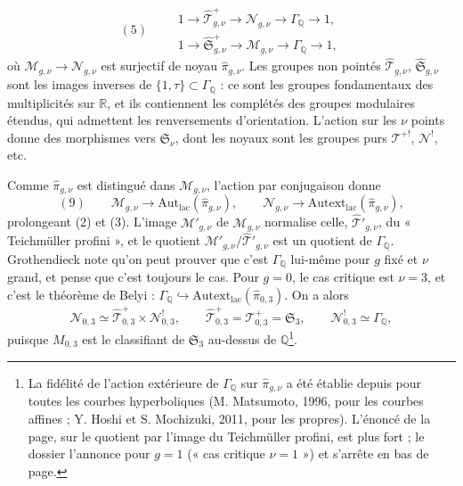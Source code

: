 \documentclass[11pt,a4paper]{article}
\begin{document}
\[
(5)\qquad
\begin{gathered}
1 \to \hat{\mathcal{T}}^{+}_{g,\nu} \to \mathcal{N}_{g,\nu} \to \Gamma_{\mathbb{Q}} \to 1, \\
1 \to \hat{\mathfrak{S}}^{+}_{g,\nu} \to \mathcal{M}_{g,\nu} \to \Gamma_{\mathbb{Q}} \to 1,
\end{gathered}
\]
où $\mathcal{M}_{g,\nu} \to \mathcal{N}_{g,\nu}$ est surjectif de noyau
$\hat\pi_{g,\nu}$. Les groupes non pointés $\hat{\mathcal{T}}_{g,\nu}$,
$\hat{\mathfrak{S}}_{g,\nu}$ sont les images inverses de
$\{1, \tau\} \subset \Gamma_{\mathbb{Q}}$ : ce sont les groupes fondamentaux
des multiplicités sur $\mathbb{R}$, et ils contiennent les complétés des groupes
modulaires étendus, qui admettent les renversements d'orientation. L'action
sur les $\nu$ points donne des morphismes vers $\mathfrak{S}_\nu$, dont les
noyaux sont les groupes purs $\mathcal{T}^{+!}$, $\mathcal{N}^{!}$, etc.

Comme $\hat\pi_{g,\nu}$ est distingué dans $\mathcal{M}_{g,\nu}$, l'action par
conjugaison donne
\[
(9)\qquad \mathcal{M}_{g,\nu} \to \mathrm{Aut}_{\mathrm{lac}}(\hat\pi_{g,\nu}), \qquad
\mathcal{N}_{g,\nu} \to \mathrm{Autext}_{\mathrm{lac}}(\hat\pi_{g,\nu}),
\]
prolongeant (2) et (3). L'image $\mathcal{M}'_{g,\nu}$ de $\mathcal{M}_{g,\nu}$
normalise celle, $\hat{\mathcal{T}}'_{g,\nu}$, du « Teichmüller profini », et
le quotient $\mathcal{M}'_{g,\nu}/\hat{\mathcal{T}}'_{g,\nu}$ est un quotient de
$\Gamma_{\mathbb{Q}}$. Grothendieck note qu'on peut prouver que c'est
$\Gamma_{\mathbb{Q}}$ lui-même pour $g$ fixé et $\nu$ grand, et pense que c'est
toujours le cas. Pour $g = 0$, le cas critique est $\nu = 3$, et c'est le
théorème de Belyi : $\Gamma_{\mathbb{Q}} \hookrightarrow
\mathrm{Autext}_{\mathrm{lac}}(\hat\pi_{0,3})$. On a alors
\[
\mathcal{N}_{0,3} \simeq \hat{\mathcal{T}}^{+}_{0,3} \times \mathcal{N}^{!}_{0,3},
\qquad \hat{\mathcal{T}}^{+}_{0,3} = \mathcal{T}^{+}_{0,3} = \mathfrak{S}_3,
\qquad \mathcal{N}^{!}_{0,3} \simeq \Gamma_{\mathbb{Q}},
\]
puisque $M_{0,3}$ est le classifiant de $\mathfrak{S}_3$ au-dessus de
$\mathbb{Q}$\footnote{La fidélité de l'action extérieure de
$\Gamma_{\mathbb{Q}}$ sur $\hat\pi_{g,\nu}$ a été établie depuis pour toutes
les courbes hyperboliques (M. Matsumoto, 1996, pour les courbes affines ;
Y. Hoshi et S. Mochizuki, 2011, pour les propres). L'énoncé de la page, sur le
quotient par l'image du Teichmüller profini, est plus fort ; le dossier
l'annonce pour $g = 1$ (« cas critique $\nu = 1$ ») et s'arrête en bas de
page.}.

\end{document}

